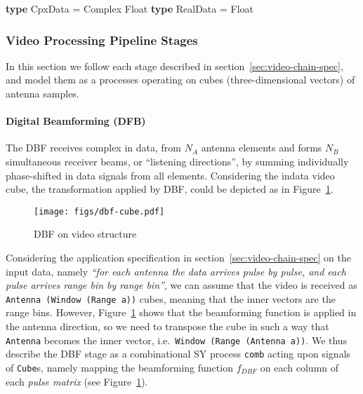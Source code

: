 \documentclass[
  a4paper,
]{article}
\newenvironment{Shaded}{}{}
\newcommand{\DataTypeTok}[1]{\textcolor[rgb]{0.56,0.13,0.00}{#1}}
\newcommand{\FunctionTok}[1]{\textcolor[rgb]{0.02,0.16,0.49}{#1}}
\newcommand{\KeywordTok}[1]{\textcolor[rgb]{0.00,0.44,0.13}{\textbf{#1}}}
\let\oldparagraph\paragraph
\renewcommand{\paragraph}[1]{\oldparagraph{#1}\mbox{}}
\begin{document}
\begin{Shaded}
\begin{Highlighting}[numbers=left,,firstnumber=100,]
\KeywordTok{type} \DataTypeTok{CpxData}  \FunctionTok{=} \DataTypeTok{Complex} \DataTypeTok{Float}
\KeywordTok{type} \DataTypeTok{RealData} \FunctionTok{=} \DataTypeTok{Float}
\end{Highlighting}
\end{Shaded}

\hypertarget{video-processing-pipeline-stages}{%
\subsubsection{Video Processing Pipeline
Stages}\label{video-processing-pipeline-stages}}

In this section we follow each stage described in
section~\ref{sec:video-chain-spec}, and model them as a processes
operating on cubes (three-dimensional vectors) of antenna samples.

\hypertarget{sec:cube-dbf-atom}{%
\paragraph{Digital Beamforming (DFB)}\label{sec:cube-dbf-atom}}

The DBF receives complex in data, from \(N_A\) antenna elements and
forms \(N_B\) simultaneous receiver beams, or ``listening directions'',
by summing individually phase-shifted in data signals from all elements.
Considering the indata video cube, the transformation applied by DBF,
could be depicted as in Figure~\ref{fig:cube-dbf-cube}.

\begin{figure}
\hypertarget{fig:cube-dbf-cube}{%
\centering
\texttt{[image: figs/dbf-cube.pdf]}
\caption{DBF on video structure}\label{fig:cube-dbf-cube}
}
\end{figure}

Considering the application specification in
section~\ref{sec:video-chain-spec} on the input data, namely \emph{``for
each antenna the data arrives \emph{pulse by pulse}, and each pulse
arrives \emph{range bin by range bin}''}, we can assume that the video
is received as \texttt{Antenna\ (Window\ (Range\ a))} cubes, meaning
that the inner vectors are the range bins. However,
Figure~\ref{fig:cube-dbf-cube} shows that the beamforming function is
applied in the antenna direction, so we need to transpose the cube in
such a way that \texttt{Antenna} becomes the inner vector,
i.e.~\texttt{Window\ (Range\ (Antenna\ a))}. We thus describe the DBF
stage as a combinational SY process \texttt{comb} acting upon signals of
\texttt{Cube}s, namely mapping the beamforming function \(f_{DBF}\) on
each column of each \emph{pulse matrix} (see
Figure~\ref{fig:cube-dbf-cube}).
\end{document}
